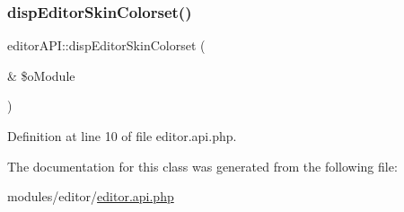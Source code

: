 \subsubsection{\texorpdfstring{disp\+Editor\+Skin\+Colorset()}{dispEditorSkinColorset()}}
{\footnotesize\ttfamily editor\+A\+P\+I\+::disp\+Editor\+Skin\+Colorset (\begin{DoxyParamCaption}\item[{\&}]{\$o\+Module }\end{DoxyParamCaption})}



Definition at line 10 of file editor.\+api.\+php.



The documentation for this class was generated from the following file\+:\begin{DoxyCompactItemize}
\item 
modules/editor/\hyperlink{editor_8api_8php}{editor.\+api.\+php}\end{DoxyCompactItemize}
